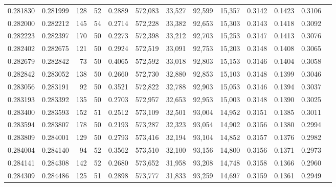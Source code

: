 \begin{tabular}{rrrrrrrrrrrrr}
0.281830 & 0.281999 &   128 &  52 &                                     0.2889 & 572,083 &  33,527 &  92,599 &  15,357 & 0.3142 & 0.1423 & 0.3106 \\
0.282000 & 0.282212 &   145 &  54 &                                     0.2714 & 572,228 &  33,382 &  92,653 &  15,303 & 0.3143 & 0.1418 & 0.3092 \\
0.282223 & 0.282397 &   170 &  50 &                                     0.2273 & 572,398 &  33,212 &  92,703 &  15,253 & 0.3147 & 0.1413 & 0.3076 \\
0.282402 & 0.282675 &   121 &  50 &                                     0.2924 & 572,519 &  33,091 &  92,753 &  15,203 & 0.3148 & 0.1408 & 0.3065 \\
0.282679 & 0.282842 &    73 &  50 &                                     0.4065 & 572,592 &  33,018 &  92,803 &  15,153 & 0.3146 & 0.1404 & 0.3058 \\
0.282842 & 0.283052 &   138 &  50 &                                     0.2660 & 572,730 &  32,880 &  92,853 &  15,103 & 0.3148 & 0.1399 & 0.3046 \\
0.283056 & 0.283191 &    92 &  50 &                                     0.3521 & 572,822 &  32,788 &  92,903 &  15,053 & 0.3146 & 0.1394 & 0.3037 \\
0.283193 & 0.283392 &   135 &  50 &                                     0.2703 & 572,957 &  32,653 &  92,953 &  15,003 & 0.3148 & 0.1390 & 0.3025 \\
0.283400 & 0.283593 &   152 &  51 &                                     0.2512 & 573,109 &  32,501 &  93,004 &  14,952 & 0.3151 & 0.1385 & 0.3011 \\
0.283594 & 0.283807 &   178 &  50 &                                     0.2193 & 573,287 &  32,323 &  93,054 &  14,902 & 0.3156 & 0.1380 & 0.2994 \\
0.283809 & 0.284001 &   129 &  50 &                                     0.2793 & 573,416 &  32,194 &  93,104 &  14,852 & 0.3157 & 0.1376 & 0.2982 \\
0.284004 & 0.284140 &    94 &  52 &                                     0.3562 & 573,510 &  32,100 &  93,156 &  14,800 & 0.3156 & 0.1371 & 0.2973 \\
0.284141 & 0.284308 &   142 &  52 &                                     0.2680 & 573,652 &  31,958 &  93,208 &  14,748 & 0.3158 & 0.1366 & 0.2960 \\
0.284309 & 0.284486 &   125 &  51 &                                     0.2898 & 573,777 &  31,833 &  93,259 &  14,697 & 0.3159 & 0.1361 & 0.2949 \\

\end{tabular}
